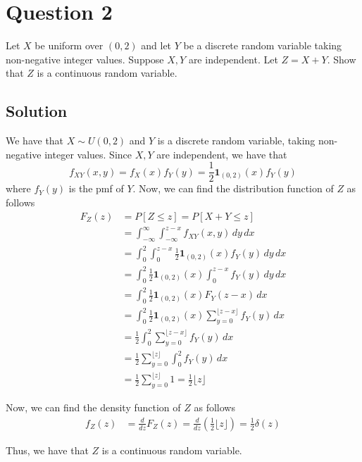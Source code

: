\section*{Question 2}

Let \( X \) be uniform over \( (0,2) \) and let \( Y \) be a discrete random variable taking non-negative integer values.
Suppose \( X, Y \) are independent.
Let \( Z=X+Y \).
Show that \( Z \) is a continuous random variable.

\subsection*{Solution}

We have that \( X \sim U(0,2) \) and \( Y \) is a discrete random variable, taking non-negative integer values.
Since \( X, Y \) are independent, we have that
\begin{equation*}
    f_{XY}(x, y)
    =
    f_{X}(x) f_{Y}(y)
    =
    \frac{1}{2} \mathbf{1}_{(0,2)}(x) f_{Y}(y)
\end{equation*}
where \( f_{Y}(y) \) is the pmf of \( Y \).
Now, we can find the distribution function of \( Z \) as follows
\begin{align*}
    F_{Z}(z)
     & =
    P[Z \leq z]
    =
    P[X+Y \leq z]
    \\ & =
    \int_{-\infty}^{\infty} \int_{-\infty}^{z-x} f_{XY}(x, y) \, dy \, dx
    \\ & =
    \int_{0}^{2} \int_{0}^{z-x} \frac{1}{2} \mathbf{1}_{(0,2)}(x) f_{Y}(y) \, dy \, dx
    \\ & =
    \int_{0}^{2} \frac{1}{2} \mathbf{1}_{(0,2)}(x) \int_{0}^{z-x} f_{Y}(y) \, dy \, dx
    \\ & =
    \int_{0}^{2} \frac{1}{2} \mathbf{1}_{(0,2)}(x) F_{Y}(z-x) \, dx
    \\ & =
    \int_{0}^{2} \frac{1}{2} \mathbf{1}_{(0,2)}(x) \sum_{y=0}^{\lfloor z-x \rfloor} f_{Y}(y) \, dx
    \\ & =
    \frac{1}{2} \int_{0}^{2} \sum_{y=0}^{\lfloor z-x \rfloor} f_{Y}(y) \, dx
    \\ & =
    \frac{1}{2} \sum_{y=0}^{\lfloor z \rfloor} \int_{0}^{2} f_{Y}(y) \, dx
    \\ & =
    \frac{1}{2} \sum_{y=0}^{\lfloor z \rfloor} 1
    =
    \frac{1}{2} \lfloor z \rfloor
\end{align*}

Now, we can find the density function of \( Z \) as follows
\begin{align*}
    f_{Z}(z)
     & =
    \frac{d}{dz} F_{Z}(z)
    =
    \frac{d}{dz} \left( \frac{1}{2} \lfloor z \rfloor \right)
    =
    \frac{1}{2} \delta(z)
\end{align*}

Thus, we have that \( Z \) is a continuous random variable.
